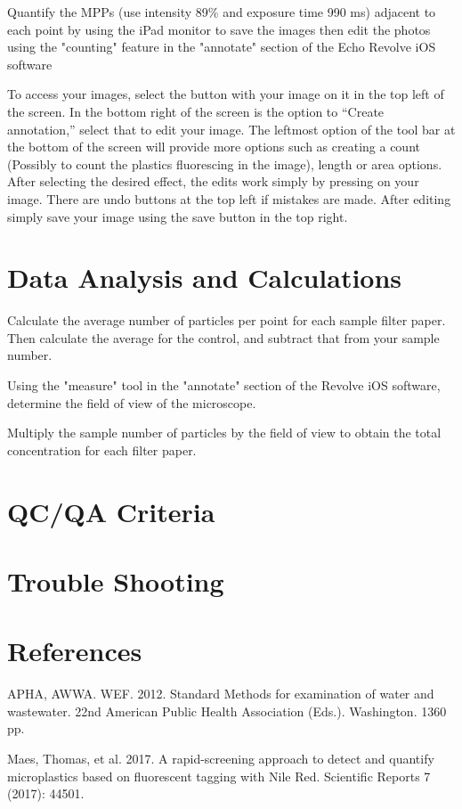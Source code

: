 \documentclass[12pt]{../SOP4_alpha}\usepackage[]{graphicx}\usepackage[]{color}
\begin{document}
  \NP Quantify the MPPs (use intensity 89\% and exposure time 990 ms) adjacent to each point by using the iPad monitor to save the images then edit the photos using the "counting" feature in the "annotate" section of the Echo Revolve iOS software

\NP To access your images, select the button with your image on it in the top left of the screen. In the bottom right of the screen is the option to ``Create annotation,'' select that to edit your image. The leftmost option of the tool bar at the bottom of the screen will provide more options such as creating a count (Possibly to count the plastics fluorescing in the image), length or area options. After selecting the desired effect, the edits work  simply by pressing on your image. There are undo buttons at the top left if mistakes are made. After editing simply save your image using the save button in the top right.

\section{Data Analysis and Calculations}

  \NP Calculate the average number of particles per point for each sample filter paper. Then calculate the average for the control, and subtract that from your sample number.

  \NP Using the "measure" tool in the "annotate" section of the Revolve iOS software, determine the field of view of the microscope.

  \NP Multiply the sample number of particles by the field of view to obtain the total concentration for each filter paper.
  


\section{QC/QA Criteria}

\section{Trouble Shooting}

\section{References}

\NP APHA, AWWA. WEF. 2012. Standard Methods for examination of water and wastewater. 22nd American Public Health Association (Eds.). Washington. 1360 pp.

\NP Maes, Thomas, et al. 2017. A rapid-screening approach to detect and quantify microplastics based on fluorescent tagging with Nile Red. Scientific Reports 7 (2017): 44501.
\end{document}
